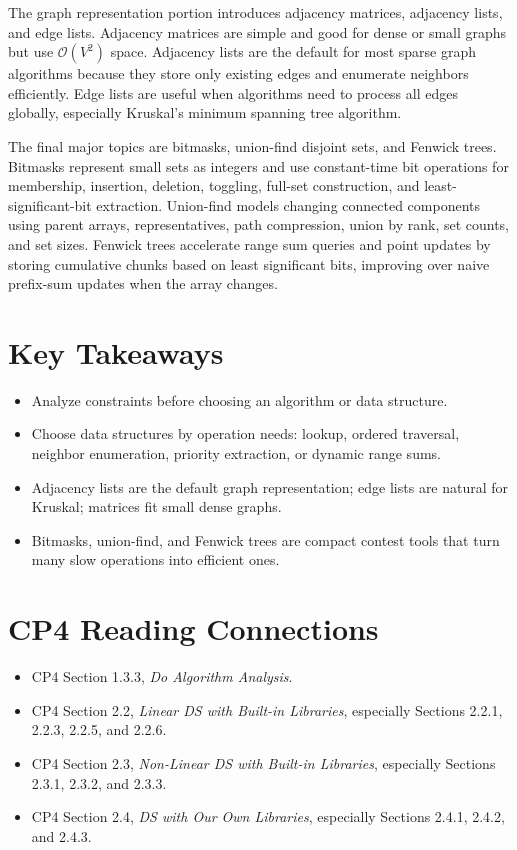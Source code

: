 \documentclass[11pt]{article}
\begin{document}
The graph representation portion introduces adjacency matrices, adjacency lists, and edge lists. Adjacency matrices are simple and good for dense or small graphs but use \(\mathcal{O}(V^2)\) space. Adjacency lists are the default for most sparse graph algorithms because they store only existing edges and enumerate neighbors efficiently. Edge lists are useful when algorithms need to process all edges globally, especially Kruskal's minimum spanning tree algorithm.

The final major topics are bitmasks, union-find disjoint sets, and Fenwick trees. Bitmasks represent small sets as integers and use constant-time bit operations for membership, insertion, deletion, toggling, full-set construction, and least-significant-bit extraction. Union-find models changing connected components using parent arrays, representatives, path compression, union by rank, set counts, and set sizes. Fenwick trees accelerate range sum queries and point updates by storing cumulative chunks based on least significant bits, improving over naive prefix-sum updates when the array changes.

\section*{Key Takeaways}
\begin{itemize}
  \item Analyze constraints before choosing an algorithm or data structure.
  \item Choose data structures by operation needs: lookup, ordered traversal, neighbor enumeration, priority extraction, or dynamic range sums.
  \item Adjacency lists are the default graph representation; edge lists are natural for Kruskal; matrices fit small dense graphs.
  \item Bitmasks, union-find, and Fenwick trees are compact contest tools that turn many slow operations into efficient ones.
\end{itemize}

\section*{CP4 Reading Connections}
\begin{itemize}
  \item CP4 Section 1.3.3, \textit{Do Algorithm Analysis}.
  \item CP4 Section 2.2, \textit{Linear DS with Built-in Libraries}, especially Sections 2.2.1, 2.2.3, 2.2.5, and 2.2.6.
  \item CP4 Section 2.3, \textit{Non-Linear DS with Built-in Libraries}, especially Sections 2.3.1, 2.3.2, and 2.3.3.
  \item CP4 Section 2.4, \textit{DS with Our Own Libraries}, especially Sections 2.4.1, 2.4.2, and 2.4.3.
\end{itemize}
\end{document}
